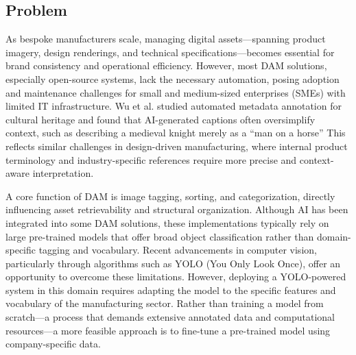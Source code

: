 \documentclass[a4paper,10pt,twocolumn]{article}
\numberwithin{figure}{section}
\numberwithin{table}{section}
\begin{document}

\subsection{Problem}
As bespoke manufacturers scale, managing digital assets—spanning product imagery, design renderings,
and technical specifications—becomes essential for brand consistency and operational efficiency.
However, most DAM solutions, especially open-source systems, lack the necessary automation, 
posing adoption and maintenance challenges for small and medium-sized enterprises (SMEs) with limited IT infrastructure. 
Wu et al. studied automated metadata annotation for cultural heritage and found that AI-generated 
captions often oversimplify context, such as describing a medieval knight merely as a “man on a horse” \citep{MINGfANG} 
This reflects similar challenges in design-driven manufacturing, where internal product terminology and industry-specific 
references require more precise and context-aware interpretation.

A core function of DAM is image tagging, sorting, and categorization, directly influencing asset 
retrievability and structural organization. Although AI has been integrated into some DAM solutions,
 these implementations typically rely on large pre-trained models that offer broad object classification 
 rather than domain-specific tagging and vocabulary. Recent advancements in computer vision, 
 particularly through algorithms such as YOLO (You Only Look Once), 
offer an opportunity to overcome these limitations. However, deploying a YOLO-powered system in this domain
 requires adapting the model to the specific features and vocabulary of the manufacturing sector. Rather than
  training a model from scratch—a process that demands extensive annotated data and computational resources—a 
  more feasible approach is to fine-tune a pre-trained model using company-specific data. 
\end{document}
